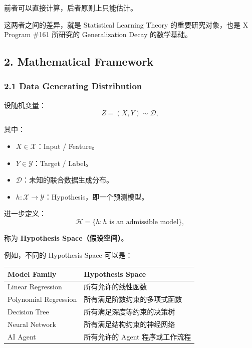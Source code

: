前者可以直接计算，后者原则上只能估计。

这两者之间的差异，就是 Statistical Learning Theory 的重要研究对象，也是 X Program \#161 所研究的 Generalization Decay 的数学基础。

\hypertarget{part-2-12-0001-mathematical-framework}{%
\subsection{2. Mathematical Framework}\label{part-2-12-0001-mathematical-framework}}

\hypertarget{part-2-12-0001-data-generating-distribution}{%
\subsubsection{2.1 Data Generating Distribution}\label{part-2-12-0001-data-generating-distribution}}

设随机变量：
\[Z=(X,Y)\sim\mathcal D,\]

其中：

\begin{itemize}
\tightlist
\item
  \(X\in\mathcal X\)：Input / Feature。
\item
  \(Y\in\mathcal Y\)：Target / Label。
\item
  \(\mathcal D\)：未知的联合数据生成分布。
\item
  \(h:\mathcal X\to\mathcal Y\)：Hypothesis，即一个预测模型。
\end{itemize}

进一步定义：
\[\mathcal H=\{h:h\text{ is an admissible model}\},\]

称为 \textbf{Hypothesis Space（假设空间）}。

例如，不同的 Hypothesis Space 可以是：

\begin{readertable}
\begin{longtable}[]{@{}
  >{\raggedright\arraybackslash}p{}
  >{\raggedright\arraybackslash}p{}@{}}
\toprule
Model Family & Hypothesis Space \\
\midrule
\endhead
Linear Regression & 所有允许的线性函数 \\
Polynomial Regression & 所有满足阶数约束的多项式函数 \\
Decision Tree & 所有满足深度等约束的决策树 \\
Neural Network & 所有满足结构约束的神经网络 \\
AI Agent & 所有允许的 Agent 程序或工作流程 \\
\bottomrule
\end{longtable}
\end{readertable}

